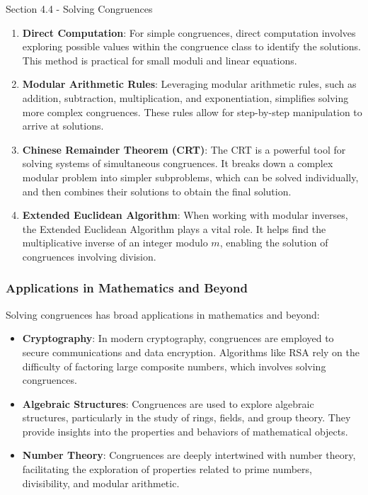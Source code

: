 \begin{notes}{Section 4.4 - Solving Congruences}
    \begin{enumerate}
        \item \textbf{Direct Computation}: For simple congruences, direct computation involves exploring possible values within the congruence class to identify the solutions. This method is practical 
        for small moduli and linear equations.
        \item \textbf{Modular Arithmetic Rules}: Leveraging modular arithmetic rules, such as addition, subtraction, multiplication, and exponentiation, simplifies solving more complex congruences. 
        These rules allow for step-by-step manipulation to arrive at solutions.
        \item \textbf{Chinese Remainder Theorem (CRT)}: The CRT is a powerful tool for solving systems of simultaneous congruences. It breaks down a complex modular problem into simpler subproblems, 
        which can be solved individually, and then combines their solutions to obtain the final solution.
        \item \textbf{Extended Euclidean Algorithm}: When working with modular inverses, the Extended Euclidean Algorithm plays a vital role. It helps find the multiplicative inverse of an integer 
        modulo \(m\), enabling the solution of congruences involving division.
    \end{enumerate}

    \subsubsection*{Applications in Mathematics and Beyond}

    Solving congruences has broad applications in mathematics and beyond:

    \begin{itemize}
        \item \textbf{Cryptography}: In modern cryptography, congruences are employed to secure communications and data encryption. Algorithms like RSA rely on the difficulty of factoring large 
        composite numbers, which involves solving congruences.
        \item \textbf{Algebraic Structures}: Congruences are used to explore algebraic structures, particularly in the study of rings, fields, and group theory. They provide insights into the 
        properties and behaviors of mathematical objects.
        \item \textbf{Number Theory}: Congruences are deeply intertwined with number theory, facilitating the exploration of properties related to prime numbers, divisibility, and modular arithmetic.
    \end{itemize}


\end{notes}

